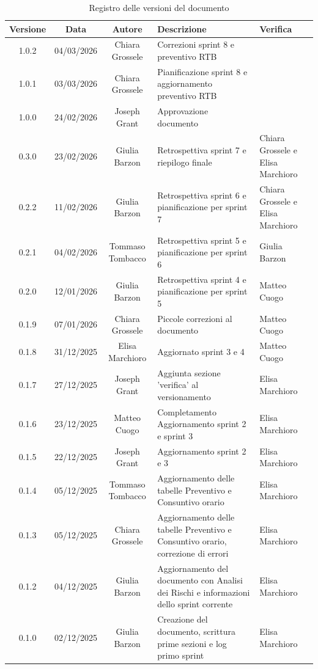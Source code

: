 \documentclass[11pt,a4paper]{article}
\begin{document}
\begin{table}[H]
    \centering
    \begin{tabular}{|c|c|c|>{\raggedright\arraybackslash}p{}|p{}|}
        \hline
        \textbf{Versione} & \textbf{Data} & \textbf{Autore} & \textbf{Descrizione} & \textbf{Verifica} \\
        \hline
        1.0.2 & 04/03/2026 & Chiara Grossele & Correzioni sprint 8 e preventivo RTB & \\
        \hline
        1.0.1 & 03/03/2026 & Chiara Grossele & Pianificazione sprint 8 e aggiornamento preventivo RTB & \\
        \hline
        1.0.0 & 24/02/2026 & Joseph Grant & Approvazione documento & \\
        \hline
        0.3.0 & 23/02/2026 & Giulia Barzon & Retrospettiva sprint 7 e riepilogo finale & Chiara Grossele e Elisa Marchioro\\
        \hline
        0.2.2 & 11/02/2026 & Giulia Barzon & Retrospettiva sprint 6 e pianificazione per sprint 7 & Chiara Grossele e Elisa Marchioro\\
        \hline
        0.2.1 & 04/02/2026 & Tommaso Tombacco & Retrospettiva sprint 5 e pianificazione per sprint 6 & Giulia Barzon\\
        \hline
        0.2.0 & 12/01/2026 & Giulia Barzon & Retrospettiva sprint 4 e pianificazione per sprint 5 & Matteo Cuogo\\
        \hline
        0.1.9 & 07/01/2026 & Chiara Grossele & Piccole correzioni al documento & Matteo Cuogo\\ 
        \hline
        0.1.8 & 31/12/2025 & Elisa Marchioro & Aggiornato sprint 3 e 4 & Matteo Cuogo\\ \hline
        0.1.7 & 27/12/2025 & Joseph Grant & Aggiunta sezione 'verifica' al versionamento & Elisa Marchioro\\ \hline
        0.1.6 & 23/12/2025 & Matteo Cuogo & Completamento Aggiornamento sprint 2 e sprint 3 & Elisa Marchioro\\
        \hline
        0.1.5 & 22/12/2025 & Joseph Grant & Aggiornamento sprint 2 e 3 & Elisa Marchioro\\
        \hline
        0.1.4 & 05/12/2025 & Tommaso Tombacco & Aggiornamento delle tabelle Preventivo e Consuntivo orario & Elisa Marchioro\\
        \hline
        0.1.3 & 05/12/2025 & Chiara Grossele & Aggiornamento delle tabelle Preventivo e Consuntivo orario, correzione di errori & Elisa Marchioro\\
        \hline
        0.1.2 & 04/12/2025 & Giulia Barzon & Aggiornamento del documento con Analisi dei Rischi e informazioni dello sprint corrente & Elisa Marchioro\\
        \hline
        0.1.0 & 02/12/2025 & Giulia Barzon & Creazione del documento, scrittura prime sezioni e log primo sprint & Elisa Marchioro\\
        \hline
    \end{tabular}
    \caption{Registro delle versioni del documento}
    \label{tab:versionamento}
\end{table}
\end{document}
